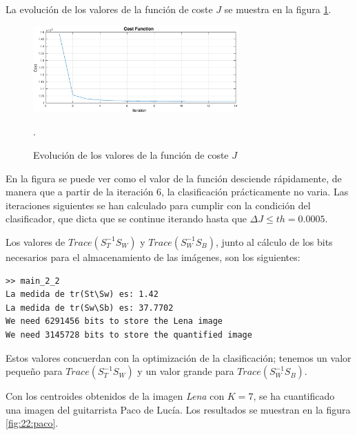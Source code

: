 \documentclass[11pt]{article} %
\begin{document}
\clearpage
{}

La evolución de los valores de la función de coste $J$ se muestra en la figura
\ref{fig:22:cost}.

\begin{figure}[h]
    \centering
    \includegraphics[width=0.7\textwidth]{../src/fig/22_cost.eps}
    \caption[]{Evolución de los valores de la función de coste $J$}.
    \label{fig:22:cost}
\end{figure}

En la figura se puede ver como el valor de la función desciende rápidamente, de
manera que a partir de la iteración 6, la clasificación prácticamente no varia.
Las iteraciones siguientes se han calculado para cumplir con la condición del
clasificador, que dicta que se continue iterando hasta
que $\Delta J \leq th = 0.0005$.

Los valores de $Trace \left( S_T^{-1} S_W \right)$ y
$Trace \left( S_W^{-1} S_B \right)$, junto al cálculo de los bits necesarios
para el almacenamiento de las imágenes, son los siguientes:

\begin{verbatim}
>> main_2_2
La medida de tr(St\Sw) es: 1.42
La medida de tr(Sw\Sb) es: 37.7702
We need 6291456 bits to store the Lena image
We need 3145728 bits to store the quantified image
\end{verbatim}

Estos valores concuerdan con la optimización de la clasificación; tenemos un
valor pequeño para $Trace \left( S_T^{-1} S_W \right)$ y un valor grande para
$Trace \left( S_W^{-1} S_B \right)$.

Con los centroides obtenidos de la imagen \emph{Lena} con $K=7$, se ha
cuantificado una imagen del guitarrista Paco de Lucía. Los resultados se
muestran en la figura \ref{fig:22:paco}.
\end{document}

